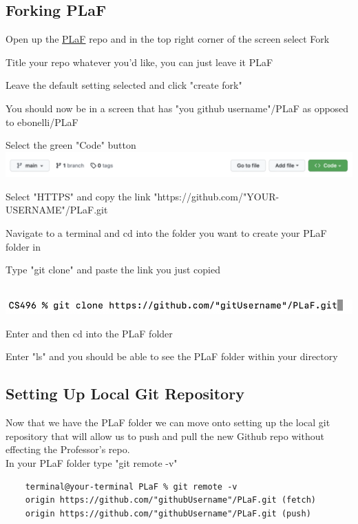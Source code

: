 \documentclass{article}
\newcommand{\SubItem}[1]{
    {\setlength\itemindent{15pt} \item[-] #1}
}
\begin{document}
\subsection{Forking PLaF}
\begin{enumerate}
    \item Open up the \href{https://github.com/ebonelli/PLaF}{PLaF} repo and in the top right corner of the screen select Fork 
    \item Title your repo whatever you'd like, you can just leave it PLaF
    \item Leave the default setting selected and click "create fork"
    \item You should now be in a screen that has "you github username"/PLaF as opposed to ebonelli/PLaF
    \item Select the green "Code" button \\
    \includegraphics[width=1\textwidth]{images/codeButton.png}
    \item Select "HTTPS" and copy the link "https://github.com/"YOUR-USERNAME"/PLaF.git
    \item Navigate to a terminal and cd into the folder you want to create your PLaF folder in
    \item Type "git clone" and paste the link you just copied \\ \\
    \centerline{\includegraphics[width=1\textwidth]{images/clone.png}}
    \item Enter and then cd into the PLaF folder
    \SubItem{Enter "ls" and you should be able to see the PLaF folder within your directory}
\end{enumerate}

\subsection{Setting Up Local Git Repository}
Now that we have the PLaF folder we can move onto setting up the local git repository that will allow us to push and pull the new Github repo without effecting the Professor's repo. \\

In your PLaF folder type "git remote -v" 
\begin{verbatim}
    terminal@your-terminal PLaF % git remote -v
    origin https://github.com/"githubUsername"/PLaF.git (fetch)
    origin https://github.com/"githubUsername"/PLaF.git (push)
\end{verbatim}
\end{document}
